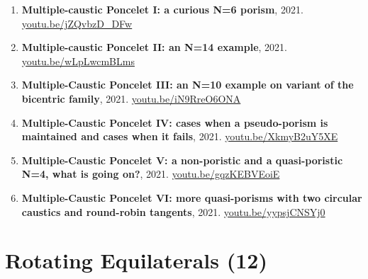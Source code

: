 \documentclass[12pt]{article}
\begin{document}
\begin{enumerate}[resume]
\item \textbf{Multiple-caustic Poncelet I: a curious N=6 porism}, 2021. \href{https://youtu.be/jZQvbzD_DFw}{\url{youtu.be/jZQvbzD\_DFw}}
\item \textbf{Multiple-caustic Poncelet II: an N=14 example}, 2021. \href{https://youtu.be/wLpLwcmBLms}{\url{youtu.be/wLpLwcmBLms}}
\item \textbf{Multiple-Caustic Poncelet III: an N=10 example on variant of the bicentric family}, 2021. \href{https://youtu.be/iN9RreO6ONA}{\url{youtu.be/iN9RreO6ONA}}
\item \textbf{Multiple-Caustic Poncelet IV: cases when a pseudo-porism is maintained and cases when it fails}, 2021. \href{https://youtu.be/XkmyB2uY5XE}{\url{youtu.be/XkmyB2uY5XE}}
\item \textbf{Multiple-Caustic Poncelet V: a non-poristic and a quasi-poristic N=4, what is going on?}, 2021. \href{https://youtu.be/gqzKEBVEoiE}{\url{youtu.be/gqzKEBVEoiE}}
\item \textbf{Multiple-Caustic Poncelet VI: more quasi-porisms with two circular caustics and round-robin tangents}, 2021. \href{https://youtu.be/yypsjCNSYj0}{\url{youtu.be/yypsjCNSYj0}}
\end{enumerate}

\section{Rotating Equilaterals (12)}
\end{document}
